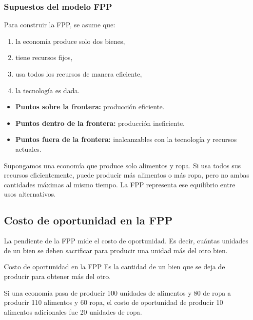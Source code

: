 \subsubsection{Supuestos del modelo FPP}

Para construir la FPP, se asume que:
\begin{enumerate}
    \item la economía produce solo dos bienes,
    \item tiene recursos fijos,
    \item usa todos los recursos de manera eficiente,
    \item la tecnología es dada.
\end{enumerate}

\begin{itemize}
    \item \textbf{Puntos sobre la frontera:} producción eficiente.
    \item \textbf{Puntos dentro de la frontera:} producción ineficiente.
    \item \textbf{Puntos fuera de la frontera:} inalcanzables con la tecnología y recursos actuales.
\end{itemize}

\begin{ejemplo}
Supongamos una economía que produce solo alimentos y ropa. Si usa todos sus recursos eficientemente, puede producir más alimentos o más ropa, pero no ambas cantidades máximas al mismo tiempo. La FPP representa ese equilibrio entre usos alternativos.
\end{ejemplo}

\subsection{Costo de oportunidad en la FPP}

La pendiente de la FPP mide el costo de oportunidad. Es decir, cuántas unidades de un bien se deben sacrificar para producir una unidad más del otro bien.

\begin{concepto}{Costo de oportunidad en la FPP}
Es la cantidad de un bien que se deja de producir para obtener más del otro.
\end{concepto}

\begin{ejemplo}
Si una economía pasa de producir 100 unidades de alimentos y 80 de ropa a producir 110 alimentos y 60 ropa, el costo de oportunidad de producir 10 alimentos adicionales fue 20 unidades de ropa.
\end{ejemplo}

